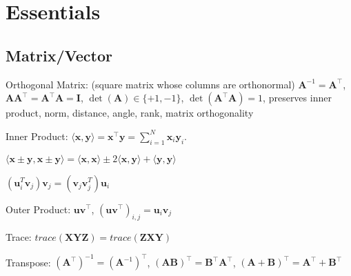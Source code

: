 \section{Essentials}
\subsection*{Matrix/Vector}
\begin{compactdesc}
	\item[Orthogonal Matrix:] (square matrix whose columns are orthonormal) $\mathbf{A}^{-1} = \mathbf{A}^\top$, $\mathbf{A} \mathbf{A}^\top = \mathbf{A}^\top \mathbf{A} = \mathbf{I}$, $\operatorname{det}(\mathbf{A}) \in \{+1, -1\}$, $\operatorname{det}(\mathbf{A}^\top \mathbf{A}) = 1$,
	preserves inner product, norm, distance, angle, rank, matrix orthogonality 
	
	\item[Inner Product:] $\langle \mathbf{x}, \mathbf{y} \rangle = \mathbf{x}^\top \mathbf{y} = \sum_{i=1}^{N} \mathbf{x}_i \mathbf{y}_i$.
	\begin{inparaitem}
		\item $\langle \mathbf{x} \pm \mathbf{y}, \mathbf{x} \pm \mathbf{y} \rangle = \langle \mathbf{x}, \mathbf{x} \rangle \pm 2 \langle \mathbf{x}, \mathbf{y} \rangle + \langle \mathbf{y}, \mathbf{y} \rangle$
		\item $(\mathbf{u}_i^T\mathbf{v}_j)\mathbf{v}_j = (\mathbf{v}_j\mathbf{v}_j^T)\mathbf{u}_i$
	\end{inparaitem}
	\item[Outer Product:] $\mathbf{u} \mathbf{v}^\top$, $(\mathbf{u} \mathbf{v}^\top)_{i, j} = \mathbf{u}_i \mathbf{v}_j$
    \item[Trace:] $\mathit{trace}(\mathbf{XYZ})=\mathit{trace}(\mathbf{ZXY})$
	\item[Transpose:] $(\mathbf{A}^\top)^{-1} = (\mathbf{A}^{-1})^\top$,  $(\mathbf{A}\mathbf{B})^\top= \mathbf{B}^\top\mathbf{A}^\top$, $(\mathbf{A}+\mathbf{B})^\top= \mathbf{A}^\top + \mathbf{B}^\top$
\end{compactdesc}


